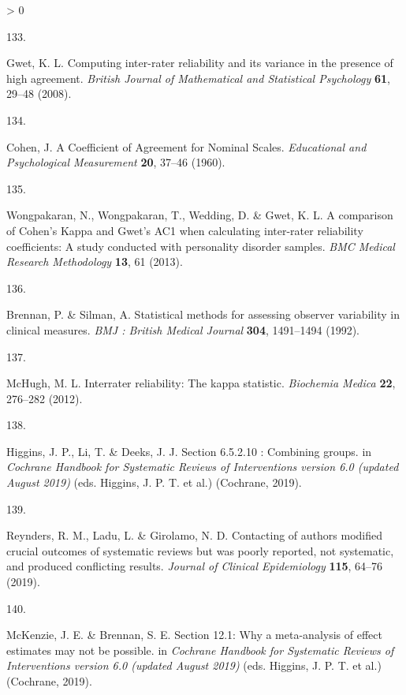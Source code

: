 \documentclass[a4paper, twoside]{templates/ociamthesis}
\newlength{\cslhangindent}
\newlength{\csllabelwidth}
\newenvironment{CSLReferences}[3] %
 {%
  \setlength{\parindent}{0pt}
  \ifodd #1 \everypar{\setlength{\hangindent}{\cslhangindent}}\ignorespaces\fi
  \ifnum #2 > 0
  \setlength{\parskip}{#2\baselineskip}
  \fi
 }%
 {}
\newcommand{\CSLLeftMargin}[1]{\parbox[t]{\maxof{\widthof{#1}}{\csllabelwidth}}{#1}}
\newcommand{\CSLRightInline}[1]{\parbox[t]{\linewidth - \csllabelwidth}{#1}}
\begin{document}
\begin{CSLReferences}{0}{0}
\leavevmode\hypertarget{ref-gwet2008}{}%
\CSLLeftMargin{133. }
\CSLRightInline{Gwet, K. L. Computing inter-rater reliability and its variance in the presence of high agreement. \emph{British Journal of Mathematical and Statistical Psychology} \textbf{61}, 29--48 (2008).}

\leavevmode\hypertarget{ref-cohen1960}{}%
\CSLLeftMargin{134. }
\CSLRightInline{Cohen, J. A {Coefficient} of {Agreement} for {Nominal Scales}. \emph{Educational and Psychological Measurement} \textbf{20}, 37--46 (1960).}

\leavevmode\hypertarget{ref-wongpakaran2013}{}%
\CSLLeftMargin{135. }
\CSLRightInline{Wongpakaran, N., Wongpakaran, T., Wedding, D. \& Gwet, K. L. A comparison of {Cohen}'s {Kappa} and {Gwet}'s {AC1} when calculating inter-rater reliability coefficients: A study conducted with personality disorder samples. \emph{BMC Medical Research Methodology} \textbf{13}, 61 (2013).}

\leavevmode\hypertarget{ref-brennan1992}{}%
\CSLLeftMargin{136. }
\CSLRightInline{Brennan, P. \& Silman, A. Statistical methods for assessing observer variability in clinical measures. \emph{BMJ : British Medical Journal} \textbf{304}, 1491--1494 (1992).}

\leavevmode\hypertarget{ref-mchugh2012}{}%
\CSLLeftMargin{137. }
\CSLRightInline{McHugh, M. L. Interrater reliability: The kappa statistic. \emph{Biochemia Medica} \textbf{22}, 276--282 (2012).}

\leavevmode\hypertarget{ref-higgins2019}{}%
\CSLLeftMargin{138. }
\CSLRightInline{Higgins, J. P., Li, T. \& Deeks, J. J. Section 6.5.2.10 : {Combining} groups. in \emph{Cochrane {Handbook} for {Systematic Reviews} of {Interventions} version 6.0 (updated {August} 2019)} (eds. Higgins, J. P. T. et al.) ({Cochrane}, 2019).}

\leavevmode\hypertarget{ref-reynders2019}{}%
\CSLLeftMargin{139. }
\CSLRightInline{Reynders, R. M., Ladu, L. \& Girolamo, N. D. Contacting of authors modified crucial outcomes of systematic reviews but was poorly reported, not systematic, and produced conflicting results. \emph{Journal of Clinical Epidemiology} \textbf{115}, 64--76 (2019).}

\leavevmode\hypertarget{ref-mckenzie2019}{}%
\CSLLeftMargin{140. }
\CSLRightInline{McKenzie, J. E. \& Brennan, S. E. Section 12.1: {Why} a meta-analysis of effect estimates may not be possible. in \emph{Cochrane {Handbook} for {Systematic Reviews} of {Interventions} version 6.0 (updated {August} 2019)} (eds. Higgins, J. P. T. et al.) ({Cochrane}, 2019).}


\end{CSLReferences}
\end{document}
